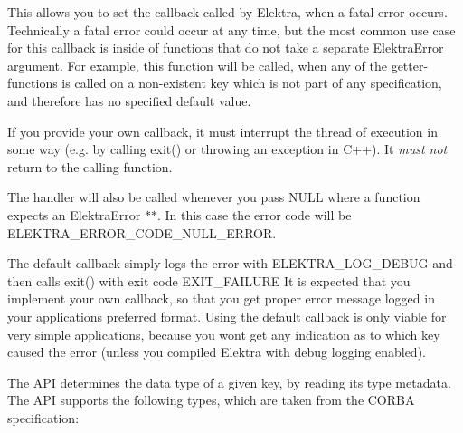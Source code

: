 \begin{DoxyCode}{0}
\end{DoxyCode}


This allows you to set the callback called by Elektra, when a fatal error occurs. Technically a fatal error could occur at any time, but the most common use case for this callback is inside of functions that do not take a separate {\ttfamily Elektra\+Error} argument. For example, this function will be called, when any of the getter-\/functions is called on a non-\/existent key which is not part of any specification, and therefore has no specified default value.

If you provide your own callback, it must interrupt the thread of execution in some way (e.\+g. by calling {\ttfamily exit()} or throwing an exception in C++). It {\itshape must not} return to the calling function.

The handler will also be called whenever you pass {\ttfamily N\+U\+LL} where a function expects an {\ttfamily Elektra\+Error $\ast$$\ast$}. In this case the error code will be {\ttfamily E\+L\+E\+K\+T\+R\+A\+\_\+\+E\+R\+R\+O\+R\+\_\+\+C\+O\+D\+E\+\_\+\+N\+U\+L\+L\+\_\+\+E\+R\+R\+OR}.

The default callback simply logs the error with {\ttfamily E\+L\+E\+K\+T\+R\+A\+\_\+\+L\+O\+G\+\_\+\+D\+E\+B\+UG} and then calls {\ttfamily exit()} with exit code {\ttfamily E\+X\+I\+T\+\_\+\+F\+A\+I\+L\+U\+RE} It is expected that you implement your own callback, so that you get proper error message logged in your applications preferred format. Using the default callback is only viable for very simple applications, because you won\textquotesingle{}t get any indication as to which key caused the error (unless you compiled Elektra with debug logging enabled).

The A\+PI determines the data type of a given key, by reading its {\ttfamily type} metadata. The A\+PI supports the following types, which are taken from the C\+O\+R\+BA specification\+:


